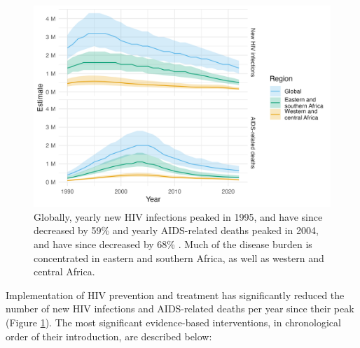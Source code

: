 \documentclass[a4paper, nobind]{templates/ociamthesis}
\begin{document}
\begin{figure}
\includegraphics[width=0.95\linewidth]{figures/hiv-aids/overall-picture} \caption{Globally, yearly new HIV infections peaked in 1995, and have since decreased by 59\% and yearly AIDS-related deaths peaked in 2004, and have since decreased by 68\% \autocite{unaids2023aidsinfo}. Much of the disease burden is concentrated in eastern and southern Africa, as well as western and central Africa.}\label{fig:overall-picture}
\end{figure}

Implementation of HIV prevention and treatment has significantly reduced the number of new HIV infections and AIDS-related deaths per year since their peak (Figure \ref{fig:overall-picture}).
The most significant evidence-based interventions, in chronological order of their introduction, are described below:
\end{document}
